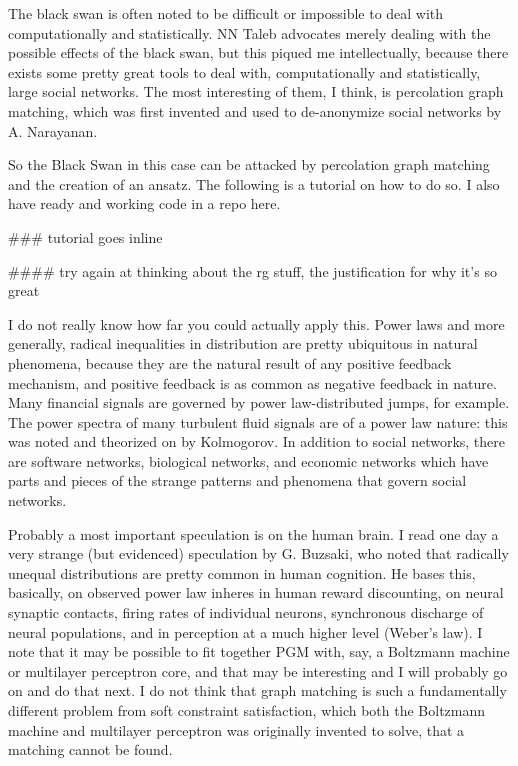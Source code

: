 \documentclass[12pt]{article}
\begin{document}
The black swan is often noted to be difficult or impossible to deal with computationally and statistically. NN Taleb advocates merely dealing with the possible effects of the black swan, but this piqued me intellectually, because there exists some pretty great tools to deal with, computationally and statistically, large social networks. The most interesting of them, I think, is percolation graph matching, which was first invented and used to de-anonymize social networks by A. Narayanan.

So the Black Swan in this case can be attacked by percolation graph matching and the creation of an ansatz. The following is a tutorial on how to do so. I also have ready and working code in a repo here.

### tutorial goes inline

#### try again at thinking about the rg stuff, the justification for why it's so great

I do not really know how far you could actually apply this. Power laws and more generally, radical inequalities in distribution are pretty ubiquitous in natural phenomena, because they are the natural result of any positive feedback mechanism, and positive feedback is as common as negative feedback in nature. Many financial signals are governed by power law-distributed jumps, for example. The power spectra of many turbulent fluid signals are of a power law nature: this was noted and theorized on by Kolmogorov. In addition to social networks, there are software networks, biological networks, and economic networks which have parts and pieces of the strange patterns and phenomena that govern social networks.

Probably a most important speculation is on the human brain. I read one day a very strange (but evidenced) speculation by G. Buzsaki, who noted that radically unequal distributions are pretty common in human cognition. He bases this, basically, on observed power law inheres in human reward discounting, on neural synaptic contacts, firing rates of individual neurons, synchronous discharge of neural populations, and in perception at a much higher level (Weber's law). I note that it may be possible to fit together PGM with, say, a Boltzmann machine or multilayer perceptron core, and that may be interesting and I will probably go on and do that next. I do not think that graph matching is such a fundamentally different problem from soft constraint satisfaction, which both the Boltzmann machine and multilayer perceptron was originally invented to solve, that a matching cannot be found.
\end{document}
